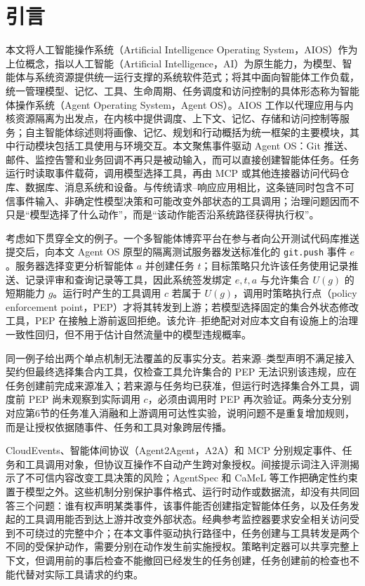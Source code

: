 \section*{引言}\label{sec:introduction-v11}

本文将人工智能操作系统（Artificial Intelligence Operating System，AIOS）作为上位概念，指以人工智能（Artificial Intelligence，AI）为原生能力，为模型、智能体与系统资源提供统一运行支撑的系统软件范式；将其中面向智能体工作负载，统一管理模型、记忆、工具、生命周期、任务调度和访问控制的具体形态称为智能体操作系统（Agent Operating System，Agent OS）。AIOS 工作以代理应用与内核资源隔离为出发点，在内核中提供调度、上下文、记忆、存储和访问控制等服务\cite{aios}；自主智能体综述则将画像、记忆、规划和行动概括为统一框架的主要模块，其中行动模块包括工具使用与环境交互\cite{agent-survey}。本文聚焦事件驱动 Agent OS：Git 推送、邮件、监控告警和业务回调不再只是被动输入，而可以直接创建智能体任务。任务运行时读取事件载荷，调用模型选择工具，再由 MCP 或其他连接器访问代码仓库、数据库、消息系统和设备。与传统请求--响应应用相比，这条链同时包含不可信事件输入、非确定性模型决策和可能改变外部状态的工具调用；治理问题因而不只是“模型选择了什么动作”，而是“该动作能否沿系统路径获得执行权”。

考虑如下贯穿全文的例子。一个多智能体博弈平台在参与者向公开测试代码库推送提交后，向本文 Agent OS 原型的隔离测试服务器发送标准化的 \texttt{git.push} 事件 $e$。服务器选择变更分析智能体 $a$ 并创建任务 $t$；目标策略只允许该任务使用记录推送、记录评审和查询记录等工具，因此系统签发绑定 $e,t,a$ 与允许集合 $U(g)$ 的短期能力 $g$。运行时产生的工具调用 $c$ 若属于 $U(g)$，调用时策略执行点（policy enforcement point，PEP）才将其转发到上游；若模型选择固定的集合外状态修改工具，PEP 在接触上游前返回拒绝。该允许--拒绝配对对应本文自有设施上的治理一致性回归，但不用于估计自然流量中的模型违规概率。

同一例子给出两个单点机制无法覆盖的反事实分支。若来源--类型声明不满足接入契约但最终选择集合内工具，仅检查工具允许集合的 PEP 无法识别该违规，应在任务创建前完成来源准入；若来源与任务均已获准，但运行时选择集合外工具，调度前 PEP 尚未观察到实际调用 $c$，必须由调用时 PEP 再次验证。两条分支分别对应第6节的任务准入消融和上游调用可达性实验，说明问题不是重复增加规则，而是让授权依据随事件、任务和工具对象跨层传播。

CloudEvents、智能体间协议（Agent2Agent，A2A）和 MCP 分别规定事件、任务和工具调用对象\cite{cloudevents,a2a,mcp}，但协议互操作不自动产生跨对象授权。间接提示词注入评测揭示了不可信内容改变工具决策的风险\cite{indirect-pi,injecagent,agentdojo,toolemu}；AgentSpec 和 CaMeL 等工作把确定性约束置于模型之外\cite{agentspec,camel}。这些机制分别保护事件格式、运行时动作或数据流，却没有共同回答三个问题：谁有权声明某类事件，该事件能否创建指定智能体任务，以及任务发起的工具调用能否到达上游并改变外部状态。经典参考监控器要求安全相关访问受到不可绕过的完整中介\cite{reference-monitor,saltzer-schroeder}；在本文事件驱动执行路径中，任务创建与工具转发是两个不同的受保护动作，需要分别在动作发生前实施授权。策略判定器可以共享完整上下文，但调用前的事后检查不能撤回已经发生的任务创建，任务创建前的检查也不能代替对实际工具请求的约束。

